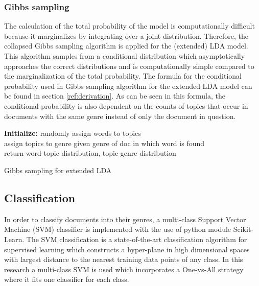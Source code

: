 \subsubsection{Gibbs sampling}
The calculation of the total probability of the model is computationally difficult because it marginalizes by integrating over a joint distribution. Therefore, the collapsed Gibbs sampling algorithm is applied for the (extended) LDA model. This algorithm samples from a conditional distribution which asymptotically approaches the correct distributions and is computationally simple compared to the marginalization of the total probability. The formula for the conditional probability used in Gibbs sampling algorithm for the extended LDA model can be found in section \ref{ref:derivation}. As can be seen in this formula, the conditional probability is also dependent on the counts of topics that occur in documents with the same genre instead of only the document in question.

\begin{mdframed}
\begin{algorithm}[H]\label{alg:create-song}
\textbf{Initialize:} randomly assign words to topics \\
 assign topics to genre given genre of doc in which word is found\\
 return word-topic distribution, topic-genre distribution
 \caption{Gibbs sampling for extended LDA}
\end{algorithm}
\end{mdframed}

\subsection{Classification}\label{sub:classification}
In order to classify documents into their genres, a multi-class Support Vector Machine (SVM) classifier is implemented with the use of python module Scikit-Learn\cite{scikit-learn}. The SVM classification is a state-of-the-art classification algorithm for supervised learning which constructs a hyper-plane in high dimensional spaces with largest distance to the nearest training data points of any class. In this research a multi-class SVM is used which incorporates a One-vs-All strategy where it fits one classifier for each class.

